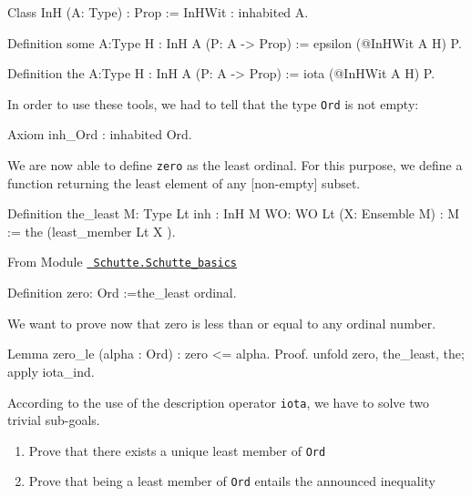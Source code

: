 \begin{Coqsrc}
Class InH (A: Type) : Prop :=
   InHWit : inhabited A.

Definition some {A:Type} {H : InH A} (P: A -> Prop) := 
   epsilon (@InHWit A H) P.

Definition the {A:Type} {H : InH A} (P: A -> Prop) := 
   iota (@InHWit A H) P.
\end{Coqsrc}

In order to use these tools,  we had to tell \coq{}  that the type \texttt{Ord} is not empty:

\begin{Coqsrc}
Axiom inh_Ord : inhabited Ord.
\end{Coqsrc}


We are now able to define \texttt{zero} as the least ordinal. For this purpose,
we define a function returning the least element of any [non-empty]  subset.


\begin{Coqsrc}
Definition the_least {M: Type} {Lt}
           {inh : InH M} {WO: WO Lt} (X: Ensemble M)  : M :=
  the  (least_member  Lt X ).
\end{Coqsrc}


\vspace{4pt}

From Module \href{../theories/html/hydras.Schutte.Schutte_basics.html}%
{\texttt{~Schutte.Schutte\_basics}}

\label{Constants:zero:Ord}

\begin{Coqsrc}
Definition zero: Ord :=the_least ordinal.
\end{Coqsrc}

We want to prove now that zero is less than or equal to any ordinal number.

\begin{Coqsrc}
Lemma zero_le (alpha : Ord) :  zero <= alpha.
Proof.
  unfold zero, the_least, the; apply iota_ind.
\end{Coqsrc}

According to the use of the description operator \texttt{iota}, we have to solve  two trivial sub-goals.
\begin{enumerate}
\item Prove that there exists a unique least member of \texttt{Ord}
\item Prove that being a least member of \texttt{Ord} entails the announced inequality 
\end{enumerate}



